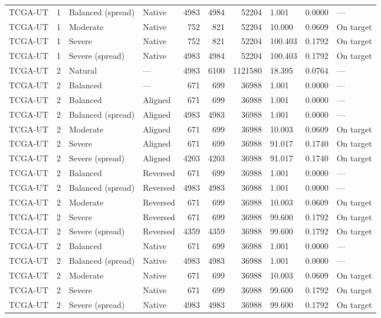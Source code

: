 \begin{longtable}{lrllrrrlll}
TCGA-UT & 1 & Balanced (spread) & Native & 4983 & 4984 & 52204 & 1.001 & 0.0000 & --- \\
TCGA-UT & 1 & Moderate & Native & 752 & 821 & 52204 & 10.000 & 0.0609 & On target \\
TCGA-UT & 1 & Severe & Native & 752 & 821 & 52204 & 100.403 & 0.1792 & On target \\
TCGA-UT & 1 & Severe (spread) & Native & 4983 & 4984 & 52204 & 100.403 & 0.1792 & On target \\
TCGA-UT & 2 & Natural & --- & 4983 & 6100 & 1121580 & 18.395 & 0.0764 & --- \\
TCGA-UT & 2 & Balanced & --- & 671 & 699 & 36988 & 1.001 & 0.0000 & --- \\
TCGA-UT & 2 & Balanced & Aligned & 671 & 699 & 36988 & 1.001 & 0.0000 & --- \\
TCGA-UT & 2 & Balanced (spread) & Aligned & 4983 & 4983 & 36988 & 1.001 & 0.0000 & --- \\
TCGA-UT & 2 & Moderate & Aligned & 671 & 699 & 36988 & 10.003 & 0.0609 & On target \\
TCGA-UT & 2 & Severe & Aligned & 671 & 699 & 36988 & 91.017 & 0.1740 & On target \\
TCGA-UT & 2 & Severe (spread) & Aligned & 4203 & 4203 & 36988 & 91.017 & 0.1740 & On target \\
TCGA-UT & 2 & Balanced & Reversed & 671 & 699 & 36988 & 1.001 & 0.0000 & --- \\
TCGA-UT & 2 & Balanced (spread) & Reversed & 4983 & 4983 & 36988 & 1.001 & 0.0000 & --- \\
TCGA-UT & 2 & Moderate & Reversed & 671 & 699 & 36988 & 10.003 & 0.0609 & On target \\
TCGA-UT & 2 & Severe & Reversed & 671 & 699 & 36988 & 99.600 & 0.1792 & On target \\
TCGA-UT & 2 & Severe (spread) & Reversed & 4359 & 4359 & 36988 & 99.600 & 0.1792 & On target \\
TCGA-UT & 2 & Balanced & Native & 671 & 699 & 36988 & 1.001 & 0.0000 & --- \\
TCGA-UT & 2 & Balanced (spread) & Native & 4983 & 4983 & 36988 & 1.001 & 0.0000 & --- \\
TCGA-UT & 2 & Moderate & Native & 671 & 699 & 36988 & 10.003 & 0.0609 & On target \\
TCGA-UT & 2 & Severe & Native & 671 & 699 & 36988 & 99.600 & 0.1792 & On target \\
TCGA-UT & 2 & Severe (spread) & Native & 4983 & 4983 & 36988 & 99.600 & 0.1792 & On target \\
\end{longtable}
